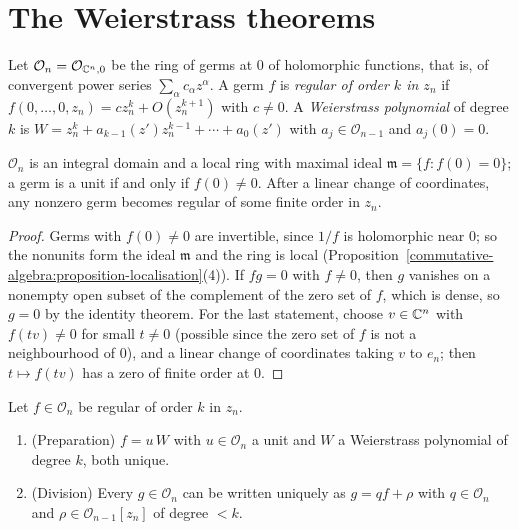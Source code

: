 \section{The Weierstrass theorems}\label{several-complex-variables:section-weierstrass}

\begin{definition}\label{several-complex-variables:definition-local-ring}
Let $\mathcal{O}_n = \mathcal{O}_{\mathbb{C}^n, 0}$ be the ring of germs at $0$ of holomorphic functions, that is, of convergent power series $\sum_\alpha c_\alpha z^\alpha$. A germ $f$ is \emph{regular of
order $k$ in $z_n$} if $f(0, \ldots, 0, z_n) = cz_n^k + O(z_n^{k+1})$ with $c \neq 0$. A \emph{Weierstrass polynomial} of degree $k$ is
$W = z_n^k + a_{k-1}(z')z_n^{k-1} + \cdots + a_0(z')$ with $a_j \in \mathcal{O}_{n-1}$ and $a_j(0) = 0$.
\end{definition}

\begin{lemma}\label{several-complex-variables:lemma-local-ring-basic}
$\mathcal{O}_n$ is an integral domain and a local ring with maximal ideal $\mathfrak{m} = \{f : f(0) = 0\}$; a germ is a unit if and only if $f(0) \neq 0$. After a linear change of coordinates, any
nonzero germ becomes regular of some finite order in $z_n$.
\end{lemma}

\begin{proof}
Germs with $f(0) \neq 0$ are invertible, since $1/f$ is holomorphic near $0$; so the nonunits form the ideal $\mathfrak{m}$ and the ring is local
(Proposition~\ref{commutative-algebra:proposition-localisation}(4)). If $fg = 0$ with $f \neq 0$, then $g$ vanishes on a nonempty open subset of the complement of the zero set of $f$, which is dense, so
$g = 0$ by the identity theorem. For the last statement, choose $v \in \mathbb{C}^n$ with $f(tv) \neq 0$ for small $t \neq 0$ (possible since the zero set of $f$ is not a neighbourhood of $0$), and a linear change
of coordinates taking $v$ to $e_n$; then $t \mapsto f(tv)$ has a zero of finite order at $0$.
\end{proof}

\begin{theorem}\label{several-complex-variables:theorem-weierstrass}
Let $f \in \mathcal{O}_n$ be regular of order $k$ in $z_n$.
\begin{enumerate}
\item (Preparation) $f = u\,W$ with $u \in \mathcal{O}_n$ a unit and $W$ a Weierstrass polynomial of degree $k$, both unique.
\item (Division) Every $g \in \mathcal{O}_n$ can be written uniquely as $g = qf + \rho$ with $q \in \mathcal{O}_n$ and $\rho \in \mathcal{O}_{n-1}[z_n]$ of degree $< k$.
\end{enumerate}
\end{theorem}

